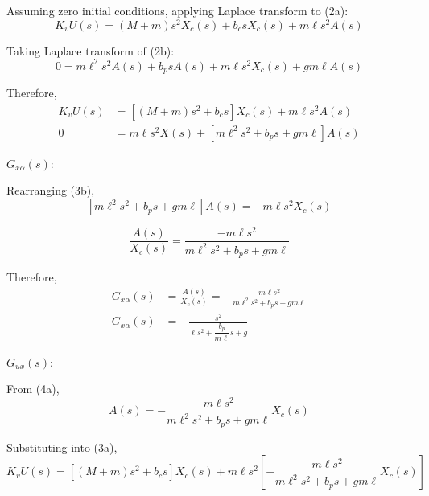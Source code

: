 \documentclass[11pt,a4paper]{article}
\begin{document}
Assuming zero initial conditions, applying Laplace transform to (2a):
\begin{equation*}
    K_{v} U(s) = \left( M + m \right) s^{2}X_{c}(s) + b_{c} s X_{c}(s)
    + m \ell s^{2} A(s)
\end{equation*}

Taking Laplace transform of (2b):
\begin{equation*}
    0 = m \ell^{2} s^{2} A(s) + b_{p} s A(s) + m \ell s^{2} X_{c}(s)
    + gm \ell A(s)
\end{equation*}

Therefore, 
\begin{align}
	K_{v} U(s) &= \left[ \left( M + m \right) s^{2} + b_{c} s \right] X_{c}(s)
	+ m \ell s^{2} A(s) \tag{3a} \\
	0 &= m \ell s^{2} X(s)
	+ \left[ m \ell^{2} s^{2} + b_{p} s + g m \ell \right] A(s) \tag{3b}
\end{align}

$G_{x\alpha}(s)$:

Rearranging (3b),
\begin{equation*}
    \left[ m \ell^{2} s^{2} + b_{p} s + g m \ell \right] A(s) =
    -m \ell s^{2} X_{c} (s)
\end{equation*}

\begin{equation*}
    \frac{A(s)}{X_{c}(s)} = 
	\frac{-m \ell s^{2}}{m \ell^{2} s^{2} + b_{p}s + g m \ell}
\end{equation*}

Therefore,
\begin{align}
    G_{x\alpha}(s) &= \frac{A(s)}{X_{c}(s)}
    = -\frac{m \ell s^{2}}{m \ell^{2} s^{2} + b_{p} s + g m \ell} \tag{4a} \\
    G_{x\alpha}(s) &= -\frac{s^{2}}{\ell s^{2} + \dfrac{b_{p}}{m \ell}s + g} 
	\tag{4b}
\end{align}

$G_{ux}(s)$:

From (4a), 
\begin{equation*}
    A(s) = -\frac{m \ell s^{2}}{m \ell^{2} s^{2} + b_{p} s + g m \ell} X_{c}(s)
\end{equation*}

Substituting into (3a),
\begin{equation*}
    K_{v} U(s) = \left[ \left( M + m \right) s^{2} + b_{c} s \right] X_{c}(s)
    + m \ell s^{2} \left[ -\frac{m \ell s^{2}}{m \ell^{2} s^{2} + b_{p} s 
	+ g m \ell} X_{c}(s) \right]
\end{equation*}
\end{document}

